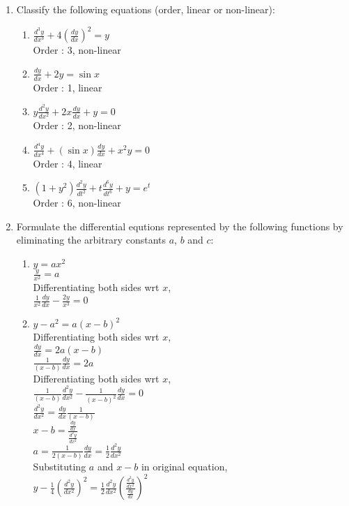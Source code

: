 \documentclass[a4paper]{article}
\begin{document}
\doublespacing
\begin{enumerate}
\item{Classify the following equations (order, linear or non-linear):}
\begin{enumerate}
\item{\(\frac{d^3y}{dx^3} + 4(\frac{dy}{dx})^2=y\)
 \\Order : 3, non-linear
}
\item{\(\frac{dy}{dx}+2y=\sin x\)
 \\Order : 1, linear
}
\item{\(y\frac{d^2y}{dx^2}+2x\frac{dy}{dx}+y=0\)
 \\Order : 2, non-linear}
\item{\(\frac{d^4y}{dx^4}+(\sin x)\frac{dy}{dx}+x^2y=0\)
\\Order : 4, linear}
\item{\((1+y^2)\frac{d^2y}{dt^2}+t\frac{d^6y}{dt^6}+y=e^t\)
\\Order : 6, non-linear}
\end{enumerate}

\item{Formulate the differential equtions represented by the following functions by eliminating the arbitrary constants $a$, $b$ and $c$}:

\begin{enumerate}
\item{$y=ax^2$
\\$\frac{y}{x^2}=a$
\\Differentiating both sides wrt $x$,
\\$\frac{1}{x^2}\frac{dy}{dx} - \frac{2y}{x^3} = 0$
}
\item{$y-a^2=a(x-b)^2$
\\Differentiating both sides wrt $x$,
\\$\frac{dy}{dx}=2a(x-b)$
\\$\frac{1}{(x-b)}\frac{dy}{dx}=2a$
\\Differentiating both sides wrt $x$,
\\$\frac{1}{(x-b)}\frac{d^2y}{dx^2}-\frac{1}{(x-b)^2}\frac{dy}{dx}=0$
\\$\frac{d^2y}{dx^2}=\frac{dy}{dx}\frac{1}{(x-b)}$
\\$x-b=\frac{\frac{dy}{dx}}{\frac{d^2y}{dx^2}}$
\\$a=\frac{1}{2(x-b)}\frac{dy}{dx}=\frac{1}{2}\frac{d^2y}{dx^2}$
\\Substituting $a$ and $x-b$ in original equation,
\\$y - \frac{1}{4}(\frac{d^2y}{dx^2})^2=\frac{1}{2}\frac{d^2y}{dx^2}(\frac{\frac{d^2y}{dx^2}}{\frac{dy}{dx}})^2$
}


\end{enumerate}
\end{enumerate}
\end{document}
